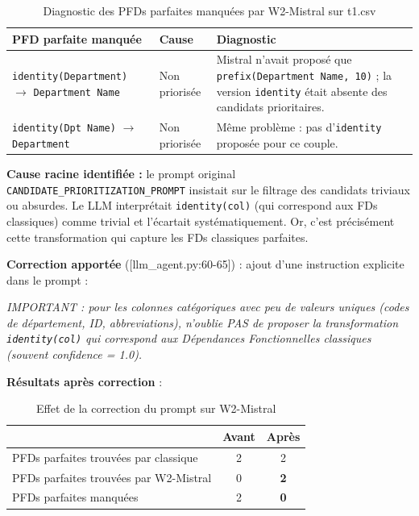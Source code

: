 \documentclass[12pt,a4paper]{article}
\begin{document}
\begin{table}[H]
\centering
\caption{Diagnostic des PFDs parfaites manqu\'{e}es par W2-Mistral sur t1.csv}
\label{tab:err-init}
\footnotesize
\begin{tabularx}{\linewidth}{@{}p{5cm}lX@{}}
\toprule
\textbf{PFD parfaite manqu\'{e}e} & \textbf{Cause} & \textbf{Diagnostic} \\
\midrule
\texttt{identity(Department)} $\to$ \texttt{Department Name} & Non prioris\'{e}e & Mistral n'avait propos\'{e} que \texttt{prefix(Department Name, 10)} ; la version \texttt{identity} \'{e}tait absente des candidats prioritaires. \\
\texttt{identity(Dpt Name)} $\to$ \texttt{Department} & Non prioris\'{e}e & M\^{e}me probl\`{e}me : pas d'\texttt{identity} propos\'{e}e pour ce couple. \\
\bottomrule
\end{tabularx}
\end{table}

\textbf{Cause racine identifi\'{e}e :} le prompt original \texttt{CANDIDATE\_PRIORITIZATION\_PROMPT} insistait sur le filtrage des candidats \og{}triviaux ou absurdes\fg{}. Le LLM interpr\'{e}tait \texttt{identity(col)} (qui correspond aux FDs classiques) comme \og{}trivial\fg{} et l'\'{e}cartait syst\'{e}matiquement. Or, c'est pr\'{e}cis\'{e}ment cette transformation qui capture les FDs classiques parfaites.

\textbf{Correction apport\'{e}e} ([llm\_agent.py:60-65]) : ajout d'une instruction explicite dans le prompt :

\begin{tcolorbox}[colback=yellow!5!white, colframe=yellow!50!black]
\textit{\og{}IMPORTANT : pour les colonnes cat\'{e}goriques avec peu de valeurs uniques (codes de d\'{e}partement, ID, abbreviations), n'oublie PAS de proposer la transformation \texttt{identity(col)} qui correspond aux D\'{e}pendances Fonctionnelles classiques (souvent confidence = 1.0).\fg{}}
\end{tcolorbox}

\textbf{R\'{e}sultats apr\`{e}s correction} :

\begin{table}[H]
\centering
\caption{Effet de la correction du prompt sur W2-Mistral}
\label{tab:err-fix}
\begin{tabular}{@{}lcc@{}}
\toprule
& \textbf{Avant} & \textbf{Apr\`{e}s} \\
\midrule
PFDs parfaites trouv\'{e}es par classique & 2 & 2 \\
PFDs parfaites trouv\'{e}es par W2-Mistral & 0 & \textbf{2} \\
PFDs parfaites manqu\'{e}es & 2 & \textbf{0} \\
\bottomrule
\end{tabular}
\end{table}
\end{document}
